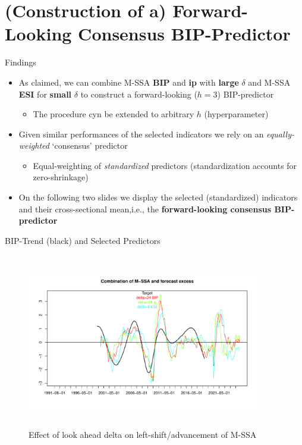 \documentclass{beamer}
\begin{document}
\section{(Construction of a) Forward-Looking Consensus BIP-Predictor}

\frame{\sectionpage}


\begin{frame} {Findings}
\begin{itemize}
\item As claimed, we can combine M-SSA \textbf{BIP} and \textbf{ip} with \textbf{large} $\delta$ and M-SSA \textbf{ESI} for \textbf{small} $\delta$ to construct a forward-looking ($h=3$) BIP-predictor 
\begin{itemize}
\item The procedure cyn be extended to arbitrary $h$ (hyperparameter)
\end{itemize}
\item Given similar performances of the selected indicators we rely on an \emph{equally-weighted} `consensus' predictor
\begin{itemize}
\item Equal-weighting of \emph{standardized} predictors (standardization accounts for zero-shrinkage)
\end{itemize}
\item On the following two slides we display the selected (standardized) indicators and their cross-sectional mean,i.e., the \textbf{forward-looking consensus BIP-predictor}
\end{itemize}
\end{frame}



\begin{frame} {BIP-Trend (black) and Selected Predictors}
\begin{figure}[H]\begin{center}\includegraphics[height=3in, width=4in]{bip_predictor1.pdf}\caption{Effect of look ahead delta on  left-shift/advancement of M-SSA\label{cor}}\end{center}\end{figure}\end{frame}
\end{document}
